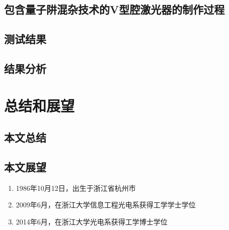 \documentclass{ZJUthesis}
\begin{document}
\section{包含量子阱混杂技术的V型腔激光器的制作过程}

\section{测试结果}

\section{结果分析}

\chapter{总结和展望}

\section{本文总结}

\section{本文展望}

\ZJUbackmatter

\begin{resume}
\begin{enumerate}
\item{1986年10月12日，出生于浙江省杭州市}
\item{2009年6月，在浙江大学信息工程光电系获得工学学士学位}
\item{2014年6月，在浙江大学光电系获得工学博士学位}
\end{enumerate}
\end{resume}
\end{document}
